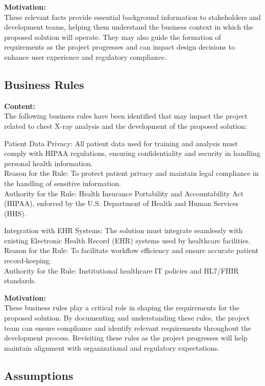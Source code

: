 \documentclass[12pt]{article}
\begin{document}
\textbf{Motivation:}\\
These relevant facts provide essential background information to stakeholders and development teams, helping them understand the business context in which the proposed solution will operate. They may also guide the formation of requirements as the project progresses and can impact design decisions to enhance user experience and regulatory compliance.

\subsection{Business Rules}

\textbf{Content:}\\
The following business rules have been identified that may impact the project related to chest X-ray analysis and the development of the proposed solution:

Patient Data Privacy: All patient data used for training and analysis must comply with HIPAA regulations\cite{hipaa}, ensuring confidentiality and security in handling personal health information.\\
Reason for the Rule: To protect patient privacy and maintain legal compliance in the handling of sensitive information.\\
Authority for the Rule: Health Insurance Portability and Accountability Act (HIPAA)\cite{hipaa}, enforced by the U.S. Department of Health and Human Services (HHS).

Integration with EHR Systems: The solution must integrate seamlessly with existing Electronic Health Record (EHR) systems used by healthcare facilities.\\
Reason for the Rule: To facilitate workflow efficiency and ensure accurate patient record-keeping.\\
Authority for the Rule: Institutional healthcare IT policies and HL7/FHIR\cite{fhir} standards.

\textbf{Motivation:}\\
These business rules play a critical role in shaping the requirements for the proposed solution. By documenting and understanding these rules, the project team can ensure compliance and identify relevant requirements throughout the development process. Revisiting these rules as the project progresses will help maintain alignment with organizational and regulatory expectations.

\subsection{Assumptions}
\end{document}
